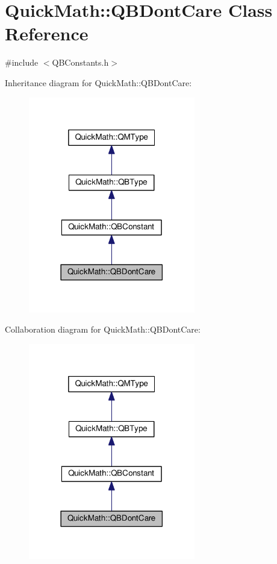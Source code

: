 \hypertarget{classQuickMath_1_1QBDontCare}{}\section{Quick\+Math\+:\+:Q\+B\+Dont\+Care Class Reference}
\label{classQuickMath_1_1QBDontCare}


{\ttfamily \#include $<$Q\+B\+Constants.\+h$>$}



Inheritance diagram for Quick\+Math\+:\+:Q\+B\+Dont\+Care\+:
\nopagebreak
\begin{figure}[H]
\begin{center}
\leavevmode
\includegraphics[width=206pt]{classQuickMath_1_1QBDontCare__inherit__graph}
\end{center}
\end{figure}


Collaboration diagram for Quick\+Math\+:\+:Q\+B\+Dont\+Care\+:
\nopagebreak
\begin{figure}[H]
\begin{center}
\leavevmode
\includegraphics[width=206pt]{classQuickMath_1_1QBDontCare__coll__graph}
\end{center}
\end{figure}
